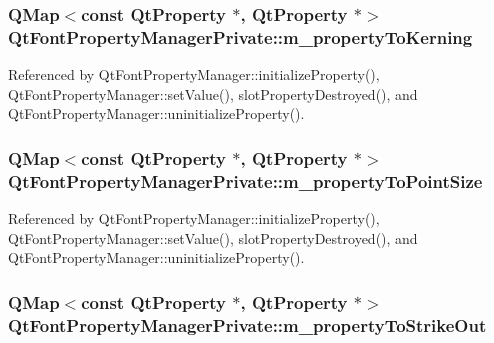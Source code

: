 \subsubsection[{m\+\_\+property\+To\+Kerning}]{\setlength{\rightskip}{0pt plus 5cm}Q\+Map$<$const {\bf Qt\+Property} $\ast$, {\bf Qt\+Property} $\ast$$>$ Qt\+Font\+Property\+Manager\+Private\+::m\+\_\+property\+To\+Kerning}\label{classQtFontPropertyManagerPrivate_a9c0416c39c1b8b4615d9ed1a21ab114b}


Referenced by Qt\+Font\+Property\+Manager\+::initialize\+Property(), Qt\+Font\+Property\+Manager\+::set\+Value(), slot\+Property\+Destroyed(), and Qt\+Font\+Property\+Manager\+::uninitialize\+Property().

\subsubsection[{m\+\_\+property\+To\+Point\+Size}]{\setlength{\rightskip}{0pt plus 5cm}Q\+Map$<$const {\bf Qt\+Property} $\ast$, {\bf Qt\+Property} $\ast$$>$ Qt\+Font\+Property\+Manager\+Private\+::m\+\_\+property\+To\+Point\+Size}\label{classQtFontPropertyManagerPrivate_ab2d2ed90dc90b1062bba21e40e07c0cc}


Referenced by Qt\+Font\+Property\+Manager\+::initialize\+Property(), Qt\+Font\+Property\+Manager\+::set\+Value(), slot\+Property\+Destroyed(), and Qt\+Font\+Property\+Manager\+::uninitialize\+Property().

\subsubsection[{m\+\_\+property\+To\+Strike\+Out}]{\setlength{\rightskip}{0pt plus 5cm}Q\+Map$<$const {\bf Qt\+Property} $\ast$, {\bf Qt\+Property} $\ast$$>$ Qt\+Font\+Property\+Manager\+Private\+::m\+\_\+property\+To\+Strike\+Out}\label{classQtFontPropertyManagerPrivate_a0bf13b2999f40d9b3d3a36653fddc1f4}


